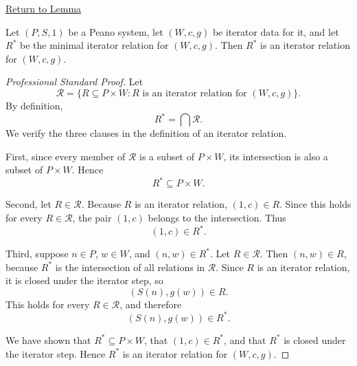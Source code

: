 \newpage
{}
\label{prf:iterator-relation-consistency}

\begin{remark*}[Return]
\hyperref[lem:iterator-relation-consistency]{Return to Lemma}
\end{remark*}

\begin{remark*}
\end{remark*}

\begin{lemma*}
Let $(P,S,1)$ be a Peano system, let $(W,c,g)$ be iterator data for it, and let
$R^*$ be the minimal iterator relation for $(W,c,g)$. Then $R^*$ is an
iterator relation for $(W,c,g)$.
\end{lemma*}

\begin{proof}[Professional Standard Proof]
\LRAProofBodyStart
Let
\[
\mathcal R=
\{R\subseteq P\times W : R \text{ is an iterator relation for } (W,c,g)\}.
\]
By definition,
\[
R^*=\bigcap \mathcal R.
\]
We verify the three clauses in the definition of an iterator relation.

First, since every member of $\mathcal R$ is a subset of $P\times W$, its
intersection is also a subset of $P\times W$. Hence
\[
R^*\subseteq P\times W.
\]

Second, let $R\in\mathcal R$. Because $R$ is an iterator relation,
$(1,c)\in R$. Since this holds for every $R\in\mathcal R$, the pair $(1,c)$
belongs to the intersection. Thus
\[
(1,c)\in R^*.
\]

Third, suppose $n\in P$, $w\in W$, and $(n,w)\in R^*$. Let $R\in\mathcal R$.
Then $(n,w)\in R$, because $R^*$ is the intersection of all relations in
\(\mathcal R\). Since $R$ is an iterator relation, it is closed under the
iterator step, so
\[
(S(n),g(w))\in R.
\]
This holds for every $R\in\mathcal R$, and therefore
\[
(S(n),g(w))\in R^*.
\]

We have shown that $R^*\subseteq P\times W$, that $(1,c)\in R^*$, and that
$R^*$ is closed under the iterator step. Hence $R^*$ is an iterator relation
for $(W,c,g)$.
\end{proof}


